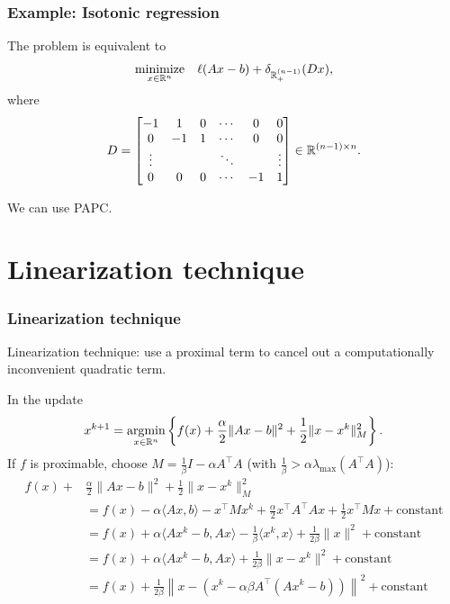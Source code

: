 \documentclass[10pt,mathserif]{beamer}
\begin{document}
\begin{frame}[fragile]
\frametitle{Example: Isotonic regression}
The problem is equivalent to
\[
\begin{array}{ll}
\underset{x\in \mathbb{R}^n}{\mbox{minimize}} &
\displaystyle{\ell(Ax-b)+\delta_{\mathbb{R}_+^{(n-1)}}(Dx)},
\end{array}
\]
where
\[
D=
\begin{bmatrix}
-1&1&0&\cdots&0&0\\
0&-1&1&\cdots&0&0\\
\vdots&&&\ddots&&\vdots\\
0&0&0&\cdots&-1&1\\
\end{bmatrix}\in \mathbb{R}^{(n-1)\times n}.
\]


\vspace{0.2in}

We can use PAPC.
\end{frame}





\section{Linearization technique}

\begin{frame}[plain]
\frametitle{Linearization technique}
Linearization technique: use a proximal term to cancel out a computationally inconvenient quadratic term.

\vspace{0.2in}
In the update
\[
x^{k+1}=
\operatorname*{argmin}_{x\in\mathbb{R}^n}\left\{
f(x)+\frac{\alpha}{2}\|Ax-b\|^2
+\frac{1}{2}\|x-x^k\|^2_M
\right\}.
\]
If $f$ is proximable, choose $M = \frac{1}{\beta}I - \alpha A^\intercal A$ (with $\frac{1}{\beta}>\alpha\lambda_\mathrm{max}(A^\intercal A)$):
\begin{align*}
f(x)+&\frac{\alpha}{2}\|Ax-b\|^2
+\frac{1}{2}\|x-x^k\|^2_M\\
&=
f(x)
-\alpha \langle Ax,b\rangle
-x^\intercal Mx^k
+\frac{\alpha}{2}x^\intercal A^\intercal Ax
+\frac{1}{2}x^\intercal Mx
+\text{constant}
\\
&= f(x)+\alpha\langle Ax^k-b,Ax\rangle
-\frac{1}{\beta}\langle x^k,x\rangle
+\frac{1}{2\beta}\|x\|^2
+\text{constant}
\\
&= f(x)+\alpha\langle Ax^k-b,Ax\rangle
+\frac{1}{2\beta}\|x-x^k\|^2
+\text{constant}
\\
&=
f(x)
+\frac{1}{2\beta}\left\|x-\left(x^k-
\alpha \beta A^\intercal(Ax^k-b)
\right)
\right\|^2
+\text{constant}
\end{align*}

\end{frame}
\end{document}

